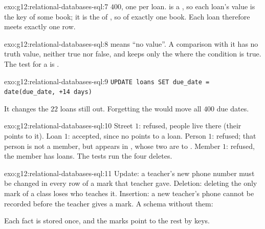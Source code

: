 \begin{solution}{exo:g12:relational-databases-sql:7}
$400$, one per loan.  is a , so each loan's value is the key of some book; it is the  of , so of exactly one book. Each loan therefore meets exactly one row.
\end{solution}

\begin{solution}{exo:g12:relational-databases-sql:8}
 means ``no value''. A comparison with it has no truth value, neither true nor false, and 
keeps only the  where the condition is true. The test for a  is
.
\end{solution}

\begin{solution}{exo:g12:relational-databases-sql:9}
\smallskip\noindent\hspace*{2em}\texttt{UPDATE loans SET due\_date = date(due\_date, \textquotesingle{}+14 days\textquotesingle{})}

\noindent\hspace*{2em}

\smallskip\noindent It changes the $22$ loans still out. Forgetting the  would move all $400$ due dates.
\end{solution}

\begin{solution}{exo:g12:relational-databases-sql:10}
Street $1$: refused, people live there (their  points to it). Loan $1$: accepted, since no 
points to a loan. Person $1$: refused; that person is not a member, but appears in , whose two
 are  to . Member $1$: refused, the member has loans. The tests run the four
deletes.
\end{solution}

\begin{solution}{exo:g12:relational-databases-sql:11}
Update: a teacher's new phone number must be changed in every row of a mark that teacher gave. Deletion: deleting the
only mark of a class loses who teaches it. Insertion: a new teacher's phone cannot be recorded before the teacher gives
a mark. A schema without them:

\smallskip\noindent\hspace*{2em}

\noindent\hspace*{2em}

\noindent\hspace*{2em}

\smallskip\noindent Each fact is stored once, and the marks point to the rest by keys.
\end{solution}

